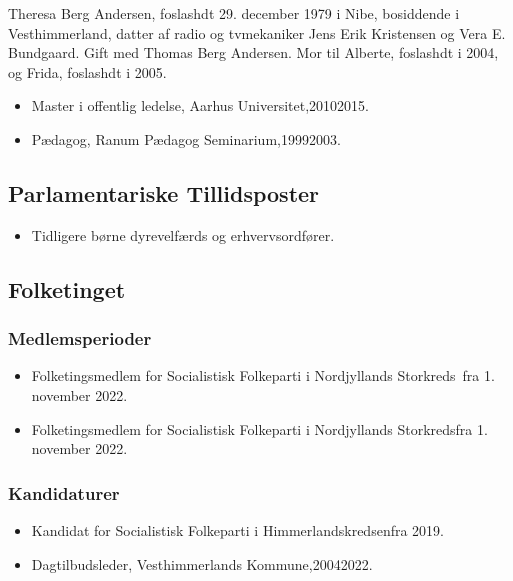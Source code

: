 \documentclass[11pt, a4paper]{awesome-cv}
\begin{document}
\makecvheader[R]
\makelettertitle
\begin{cvletter}
Theresa Berg Andersen, foslashdt 29. december 1979 i Nibe, bosiddende i Vesthimmerland, datter af radio og tvmekaniker Jens Erik Kristensen og Vera E. Bundgaard. Gift med Thomas Berg Andersen. Mor til Alberte, foslashdt i 2004, og Frida, foslashdt i 2005.

\begin{itemize}
\item Master i offentlig ledelse, Aarhus Universitet,20102015.
\item Pædagog, Ranum Pædagog Seminarium,19992003.
\end{itemize}
\subsection*{Parlamentariske Tillidsposter}
\begin{itemize}
\item Tidligere børne dyrevelfærds og erhvervsordfører.
\end{itemize}
\subsection*{Folketinget}
\subsubsection*{Medlemsperioder}
\begin{itemize}
\item Folketingsmedlem for Socialistisk Folkeparti i Nordjyllands Storkreds fra 1. november 2022.
\item Folketingsmedlem for Socialistisk Folkeparti i Nordjyllands Storkredsfra 1. november 2022.
\end{itemize}
\subsubsection*{Kandidaturer}
\begin{itemize}
\item Kandidat for Socialistisk Folkeparti i Himmerlandskredsenfra 2019.
\end{itemize}
\begin{itemize}
\item Dagtilbudsleder, Vesthimmerlands Kommune,20042022.
\end{itemize}
\end{cvletter}
\end{document}
